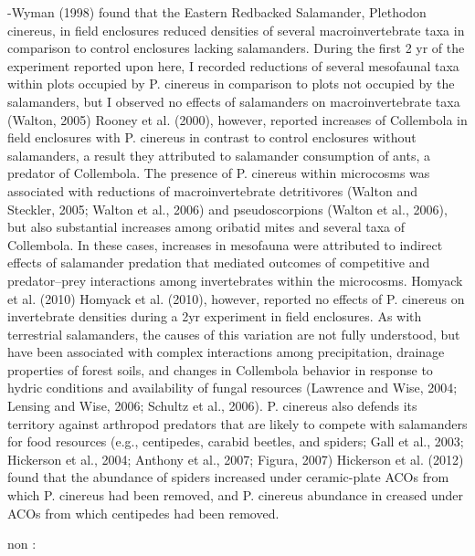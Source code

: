  -Wyman (1998) found that the Eastern Redbacked Salamander, Plethodon cinereus, in field enclosures reduced densities of several macroinvertebrate taxa in comparison to control enclosures lacking salamanders.
 During the first 2 yr of the experiment reported upon here, I recorded reductions of several mesofaunal taxa within plots occupied by P. cinereus in comparison to plots not occupied by the salamanders, but I observed no effects of salamanders on macroinvertebrate taxa (Walton, 2005)
 Rooney et al. (2000), however, reported increases of Collembola in field enclosures with P. cinereus in contrast to control enclosures without salamanders, a result they attributed to salamander consumption of ants, a predator of Collembola.
 The presence of P. cinereus within microcosms was associated with reductions of macroinvertebrate detritivores (Walton and Steckler, 2005; Walton et al., 2006) and pseudoscorpions (Walton et al., 2006), but also substantial increases among oribatid mites and several taxa of Collembola.
 In these cases, increases in mesofauna were attributed to indirect effects of salamander predation that mediated outcomes of competitive and predator–prey interactions among invertebrates within the microcosms. 
 Homyack et al. (2010) Homyack et al. (2010), however, reported no effects of P. cinereus on invertebrate densities during a 2yr experiment in field enclosures.
 As with terrestrial salamanders, the causes of this variation are not fully understood, but have been associated with complex interactions among precipitation, drainage properties of forest soils, and changes in Collembola behavior in response to hydric conditions and availability of fungal resources (Lawrence and Wise, 2004; Lensing and Wise, 2006; Schultz et al., 2006).
 P. cinereus also defends its territory against arthropod predators that are likely to compete with salamanders for food resources (e.g., centipedes, carabid beetles, and spiders; Gall et al., 2003; Hickerson et al., 2004; Anthony et al., 2007; Figura, 2007)
 Hickerson et al. (2012) found that the abundance of spiders increased under ceramic-plate ACOs from which P. cinereus had been removed, and P. cinereus abundance in creased under ACOs from which centipedes had been removed.

 
 non :





